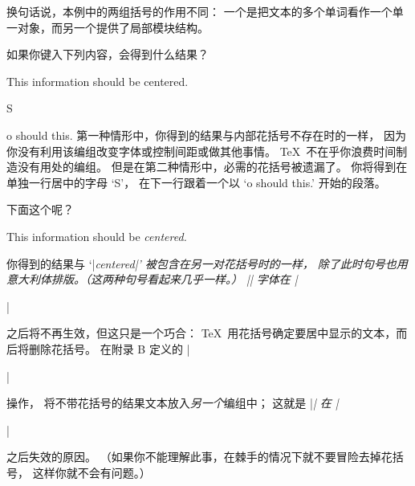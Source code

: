 换句话说，本例中的两组括号的作用不同：
一个是把文本的多个单词看作一个单一对象，而另一个提供了局部模块结构。

\exercise 如果你键入下列内容，会得到什么结果？
\begintt
\centerline{This information should be {centered}.}
\centerline So should this.
\endtt
\answer 第一种情形中，你得到的结果与内部花括号不存在时的一样，
因为你没有利用该编组改变字体或控制间距或做其他事情。
\TeX\ 不在乎你浪费时间制造没有用处的编组。
但是在第二种情形中，必需的花括号被遗漏了。
你将得到在单独一行居中的字母 `S'，
在下一行跟着一个以 `o should this.' 开始的段落。

\exercise 下面这个呢？
\begintt
\centerline{This information should be \it centered.}
\endtt
\answer 你得到的结果与 `|\it centered|' 被包含在另一对花括号时的一样，
除了此时句号也用意大利体排版。（这两种句号看起来几乎一样。）
|\it| 字体在 |\centerline| 之后将不再生效，但这只是一个巧合：
\TeX\ 用花括号确定要居中显示的文本，而后将删除花括号。
在附录 B 定义的 |\centerline|操作，
将不带花括号的结果文本放入{\sl 另一个}编组中；
这就是 |\it| 在 |\centerline| 之后失效的原因。%
（如果你不能理解此事，在棘手的情况下就不要冒险去掉花括号，
这样你就不会有问题。）

